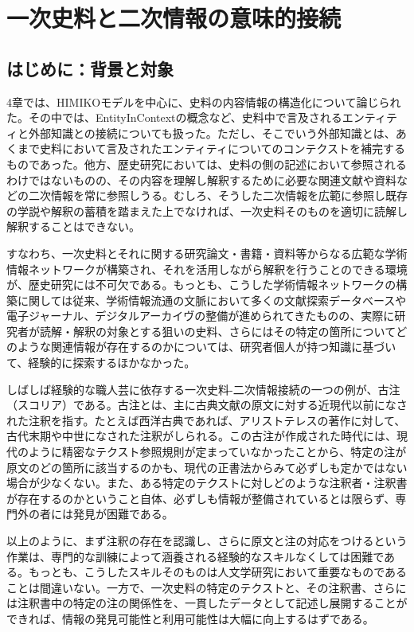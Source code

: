 
\chapter{一次史料と二次情報の意味的接続}

\section{はじめに：背景と対象}

4章では、HIMIKOモデルを中心に、史料の内容情報の構造化について論じられた。その中では、EntityInContextの概念など、史料中で言及されるエンティティと外部知識との接続についても扱った。ただし、そこでいう外部知識とは、あくまで史料において言及されたエンティティについてのコンテクストを補完するものであった。他方、歴史研究においては、史料の側の記述において参照されるわけではないものの、その内容を理解し解釈するために必要な関連文献や資料などの二次情報を常に参照しうる。むしろ、そうした二次情報を広範に参照し既存の学説や解釈の蓄積を踏まえた上でなければ、一次史料そのものを適切に読解し解釈することはできない。

すなわち、一次史料とそれに関する研究論文・書籍・資料等からなる広範な学術情報ネットワークが構築され、それを活用しながら解釈を行うことのできる環境が、歴史研究には不可欠である。もっとも、こうした学術情報ネットワークの構築に関しては従来、学術情報流通の文脈において多くの文献探索データベースや電子ジャーナル、デジタルアーカイヴの整備が進められてきたものの、実際に研究者が読解・解釈の対象とする狙いの史料、さらにはその特定の箇所についてどのような関連情報が存在するのかについては、研究者個人が持つ知識に基づいて、経験的に探索するほかなかった。

しばしば経験的な職人芸に依存する一次史料-二次情報接続の一つの例が、古注（スコリア）である。古注とは、主に古典文献の原文に対する近現代以前になされた注釈を指す。たとえば西洋古典であれば、アリストテレスの著作に対して、古代末期や中世になされた注釈がしられる。この古注が作成された時代には、現代のように精密なテクスト参照規則が定まっていなかったことから、特定の注が原文のどの箇所に該当するのかも、現代の正書法からみて必ずしも定かではない場合が少なくない。また、ある特定のテクストに対しどのような注釈者・注釈書が存在するのかということ自体、必ずしも情報が整備されているとは限らず、専門外の者には発見が困難である。

以上のように、まず注釈の存在を認識し、さらに原文と注の対応をつけるという作業は、専門的な訓練によって涵養される経験的なスキルなくしては困難である。もっとも、こうしたスキルそのものは人文学研究において重要なものであることは間違いない。一方で、一次史料の特定のテクストと、その注釈書、さらには注釈書中の特定の注の関係性を、一貫したデータとして記述し展開することができれば、情報の発見可能性と利用可能性は大幅に向上するはずである。

